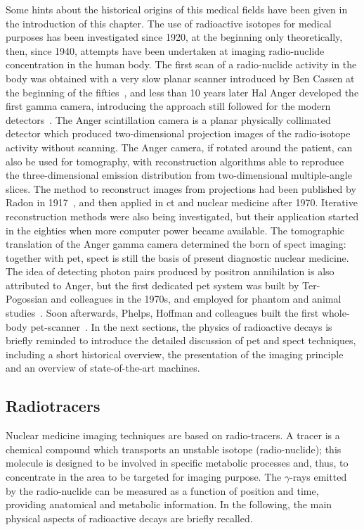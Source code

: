 Some hints about the historical origins of this medical fields have been given in the introduction of this chapter. The use of radioactive isotopes for medical purposes has been investigated since 1920, at the beginning only theoretically, then, since 1940, attempts have been undertaken at imaging radio-nuclide concentration in the human body. The first scan of a radio-nuclide activity in the body was obtained with a very slow planar scanner introduced by Ben Cassen at the beginning of the fifties~\parencite{Blahd1996}, and less than 10 years later Hal Anger developed the first gamma camera, introducing the approach still followed for the modern detectors~\parencite{Anger1958}. The Anger scintillation camera is a planar physically collimated detector which produced two-dimensional projection images of the radio-isotope activity without scanning. The Anger camera, if rotated around the patient, can also be used for tomography, with reconstruction algorithms able to reproduce the three-dimensional emission distribution from two-dimensional multiple-angle slices. The method to reconstruct images from projections had been published by Radon in 1917~\parencite{Radon1917}, and then applied in \gls{ct} and nuclear medicine after 1970. Iterative reconstruction methods were also being investigated, but their application started in the eighties when more computer power became available. The tomographic translation of the Anger gamma camera determined the born of \gls{spect} imaging: together with \gls{pet}, \gls{spect} is still the basis of present diagnostic nuclear medicine. The idea of detecting photon pairs produced by positron annihilation is also attributed to Anger, but the first dedicated \gls{pet} system was built by Ter-Pogossian and colleagues in the 1970s, and employed for phantom and animal studies~\parencite{Ter-Pogossian1975, Ter-Pogossian1983}. Soon afterwards, Phelps, Hoffman and colleagues built the first whole-body \gls{pet}-scanner~\parencite{Hoffmann1976}. 
In the next sections, the physics of radioactive decays is briefly reminded to introduce the detailed discussion of \gls{pet} and \gls{spect} techniques, including a short historical overview, the presentation of the imaging principle and an overview of state-of-the-art machines.
   
\subsection{Radiotracers}\label{chap1::subsec::NMradionuclides}

Nuclear medicine imaging techniques are based on radio-tracers. A tracer is a chemical compound which transports an unstable isotope (radio-nuclide); this molecule is designed to be involved in specific metabolic processes and, thus, to concentrate in the area to be targeted for imaging purpose. The $\gamma$-rays emitted by the radio-nuclide can be measured as a function of position and time, providing anatomical and metabolic information.  In the following, the main physical aspects of radioactive decays are briefly recalled. 


